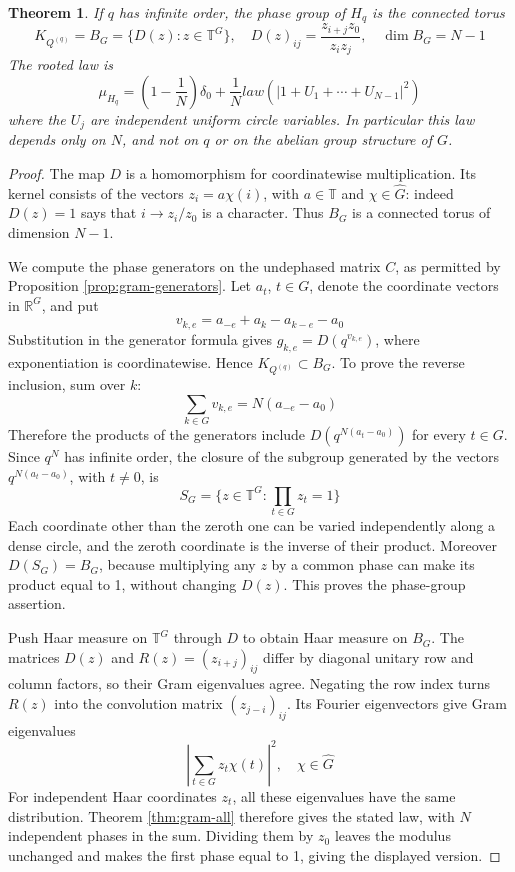 \documentclass[11pt,reqno]{amsart}
\newtheorem{thm}{Theorem}[section]
\theoremstyle{definition}
\numberwithin{equation}{section}
\begin{document}
\begin{thm}\label{thm:circulant-family}
If $q$ has infinite order, the phase group of $H_q$ is the connected torus
$$K_{Q^{(q)}}=B_G=\{D(z):z\in\mathbb T^G\},\quad D(z)_{ij}=\frac{z_{i+j}z_0}{z_iz_j},\quad \dim B_G=N-1$$
The rooted law is
$$\mu_{H_q}=\left(1-\frac1N\right)\delta_0+\frac1N law(|1+U_1+\cdots+U_{N-1}|^2)$$
where the $U_j$ are independent uniform circle variables. In particular this law depends only on $N$, and not on $q$ or on the abelian group structure of $G$.
\end{thm}
\begin{proof}
The map $D$ is a homomorphism for coordinatewise multiplication. Its kernel consists of the vectors $z_i=a\chi(i)$, with $a\in\mathbb T$ and $\chi\in\widehat G$: indeed $D(z)=1$ says that $i\to z_i/z_0$ is a character. Thus $B_G$ is a connected torus of dimension $N-1$.

We compute the phase generators on the undephased matrix $C$, as permitted by Proposition \ref{prop:gram-generators}. Let $a_t$, $t\in G$, denote the coordinate vectors in $\mathbb R^G$, and put
$$v_{k,e}=a_{-e}+a_k-a_{k-e}-a_0$$
Substitution in the generator formula gives $g_{k,e}=D(q^{v_{k,e}})$, where exponentiation is coordinatewise. Hence $K_{Q^{(q)}}\subset B_G$. To prove the reverse inclusion, sum over $k$:
$$\sum_{k\in G}v_{k,e}=N(a_{-e}-a_0)$$
Therefore the products of the generators include $D(q^{N(a_t-a_0)})$ for every $t\in G$. Since $q^N$ has infinite order, the closure of the subgroup generated by the vectors $q^{N(a_t-a_0)}$, with $t\neq0$, is
$$S_G=\{z\in\mathbb T^G:\prod_{t\in G}z_t=1\}$$
Each coordinate other than the zeroth one can be varied independently along a dense circle, and the zeroth coordinate is the inverse of their product. Moreover $D(S_G)=B_G$, because multiplying any $z$ by a common phase can make its product equal to 1, without changing $D(z)$. This proves the phase-group assertion.

Push Haar measure on $\mathbb T^G$ through $D$ to obtain Haar measure on $B_G$. The matrices $D(z)$ and $R(z)=(z_{i+j})_{ij}$ differ by diagonal unitary row and column factors, so their Gram eigenvalues agree. Negating the row index turns $R(z)$ into the convolution matrix $(z_{j-i})_{ij}$. Its Fourier eigenvectors give Gram eigenvalues
$$\left|\sum_{t\in G}z_t\chi(t)\right|^2,\quad \chi\in\widehat G$$
For independent Haar coordinates $z_t$, all these eigenvalues have the same distribution. Theorem \ref{thm:gram-all} therefore gives the stated law, with $N$ independent phases in the sum. Dividing them by $z_0$ leaves the modulus unchanged and makes the first phase equal to 1, giving the displayed version.
\end{proof}
\end{document}
